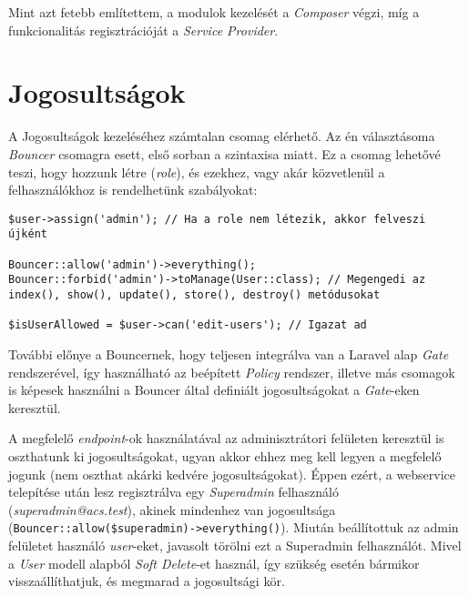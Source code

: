 \documentclass[a4paper,12pt]{thesis-ekf}
\theoremstyle{definition}
\begin{document}
				Mint azt fetebb említettem, a modulok kezelését a \emph{Composer} végzi, míg a funkcionalitás regisztrációját a \emph{Service Provider}.
		\section{Jogosultságok}
			A Jogosultságok kezeléséhez számtalan csomag elérhető. Az én választásoma \emph{Bouncer} csomagra esett, első sorban a szintaxisa miatt. Ez a csomag lehetővé teszi, hogy  hozzunk létre (\emph{role}), és ezekhez, vagy akár közvetlenül a felhasználókhoz is rendelhetünk szabályokat:
			
			\begin{lstlisting}[caption={Bouncer használata}]
$user->assign('admin'); // Ha a role nem létezik, akkor felveszi újként
			
Bouncer::allow('admin')->everything();
Bouncer::forbid('admin')->toManage(User::class); // Megengedi az index(), show(), update(), store(), destroy() metódusokat 

$isUserAllowed = $user->can('edit-users'); // Igazat ad
			\end{lstlisting}
			
			További előnye a Bouncernek, hogy teljesen integrálva van a Laravel alap \emph{Gate} rendszerével, így használható az beépített \emph{Policy} rendszer, illetve más csomagok is képesek használni a Bouncer által definiált jogosultságokat a \emph{Gate}-eken keresztül.
			
			A megfelelő \emph{endpoint}-ok használatával az adminisztrátori felületen keresztül is oszthatunk ki jogosultságokat, ugyan akkor ehhez meg kell legyen a megfelelő jogunk (nem oszthat akárki kedvére jogosultságokat). Éppen ezért, a webservice telepítése után lesz regisztrálva egy \emph{Superadmin} felhasználó (\emph{superadmin@acs.test}), akinek mindenhez van jogosultsága (\texttt{Bouncer::allow(\$superadmin)->everything()}). Miután beállítottuk az admin felületet használó \emph{user}-eket, javasolt törölni ezt a Superadmin felhasználót. Mivel a \emph{User} modell alapból \emph{Soft Delete}-et használ, így szükség esetén bármikor visszaállíthatjuk, és megmarad a jogosultsági kör.
			
\end{document}
